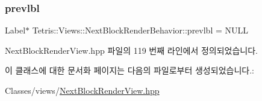 \subsubsection{\texorpdfstring{prevlbl}{prevlbl}}
{\footnotesize\ttfamily Label$\ast$ Tetris\+::\+Views\+::\+Next\+Block\+Render\+Behavior\+::prevlbl = N\+U\+LL\hspace{0.3cm}{\ttfamily [protected]}}



Next\+Block\+Render\+View.\+hpp 파일의 119 번째 라인에서 정의되었습니다.



이 클래스에 대한 문서화 페이지는 다음의 파일로부터 생성되었습니다.\+:\begin{DoxyCompactItemize}
\item 
Classes/views/\hyperlink{_next_block_render_view_8hpp}{Next\+Block\+Render\+View.\+hpp}\end{DoxyCompactItemize}
